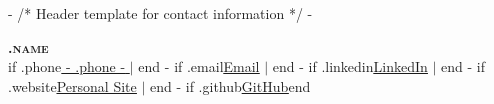 {{- /* Header template for contact information */ -}}
\begin{center}
    \textbf{\Huge \scshape {{.name}}} \\ \vspace{1pt}
    \small {{if .phone}}{\underline{ {{- .phone -}} }} $|$ {{end}}
    {{- if .email}}\href{mailto:{{.email}}}{\underline{Email}} $|$ {{end}}
    {{- if .linkedin}}\href{ {{- .linkedin -}} }{\underline{LinkedIn}} $|$ {{end}}
    {{- if .website}}\href{ {{- .website -}} }{\underline{Personal Site}} $|$ {{end}}
    {{- if .github}}\href{ {{- .github -}} }{\underline{GitHub}}{{end}}
\end{center}

